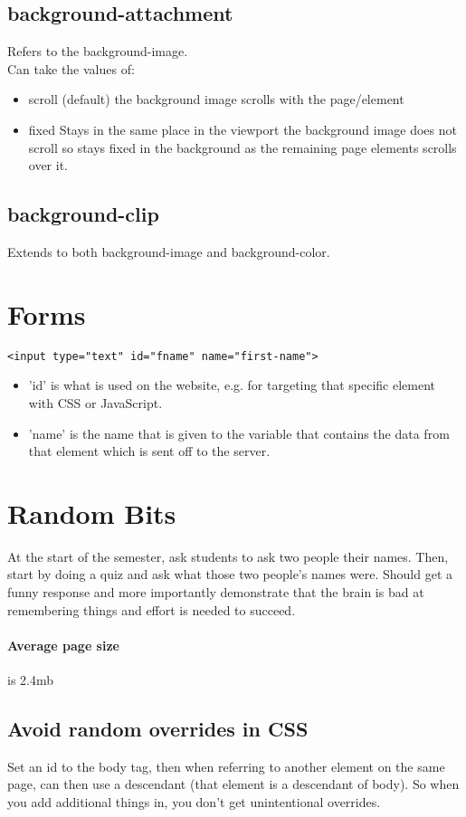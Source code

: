 \documentclass[]{article}
\newcommand{\<}{\guilsinglleft}
\renewcommand{\>}{\guilsinglright}
\begin{document}
\subsection{background-attachment}
Refers to the background-image.
\\
Can take the values of:
\begin{itemize}
	\item scroll (default)
	\subitem the background image scrolls with the page/element
	
	\item fixed
	\subitem Stays in the same place in the viewport 
	\subitem the background image does not scroll so stays fixed in the background as the remaining page elements scrolls over it. 
\end{itemize}

\subsection{background-clip}
Extends to both background-image and background-color.

\section{Forms}
\begin{lstlisting}
<input type="text" id="fname" name="first-name">
\end{lstlisting}
\begin{itemize}
	\item 'id' is what is used on the website, e.g. for targeting that specific element with CSS or JavaScript.
	\item 'name' is the name that is given to the variable that contains the data from that element which is sent off to the server.
\end{itemize}


\section{Random Bits}
At the start of the semester, ask students to ask two people their names.  Then, start by doing a quiz and ask what those two people's names were.  Should get a funny response and more importantly demonstrate that the brain is bad at remembering things and effort is needed to succeed.

\paragraph{Average page size} is 2.4mb 

\subsection{Avoid random overrides in CSS}
Set an id to the body tag, then when referring to another element on the same page, can then use a descendant (that element is a descendant of body). So when  you add additional things in, you don't get unintentional overrides.
\end{document}
